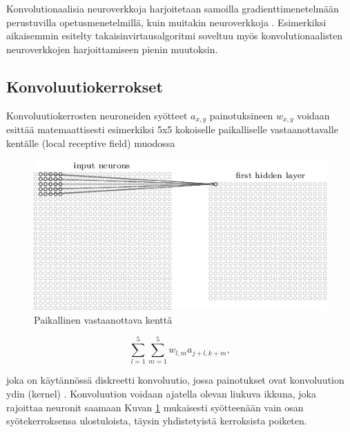 \documentclass[finnish]{tktltiki2}
\theoremstyle{definition}
\theoremstyle{remark}
\begin{document}
    Konvolutionaalisia neuroverkkoja harjoitetaan samoilla gradienttimenetelmään perustuvilla opetusmenetelmillä, kuin muitakin neuroverkkoja \cite{Nielsen-neural}. Esimerkiksi aikaisemmin esitelty takaisinvirtausalgoritmi soveltuu myös konvolutionaalisten neuroverkkojen harjoittamiseen pienin muutoksin.

    \subsection{Konvoluutiokerrokset}
    \label{chap:convolutional-layers}

    Konvoluutiokerrosten neuroneiden syötteet $a_{x,y}$ painotuksineen $w_{x,y}$ voidaan esittää matemaattisesti esimerkiksi 5x5 kokoiselle paikalliselle vastaanottavalle kentälle (local receptive field) muodossa

    \begin{figure}[h]
      \centering
      \includegraphics[scale=0.5]{local-receptive}
      \caption{Paikallinen vastaanottava kenttä \cite{Nielsen-neural}}
      \label{pic:local-receptive}
    \end{figure}

    $$ \sum_{l=1}^{5}\sum_{m=1}^{5} w_{l,m}a_{j+l,k+m},$$
    
    \noindent joka on käytännössä diskreetti konvoluutio, jossa painotukset ovat konvoluution ydin (kernel) \cite{lecun-et-al-98-convnets}. Konvoluution voidaan ajatella olevan liukuva ikkuna, joka rajoittaa neuronit saamaan Kuvan \ref{pic:local-receptive} mukaisesti syötteenään vain osan syötekerroksensa ulostuloista, täysin yhdistetyistä kerroksista poiketen. 
\end{document}

